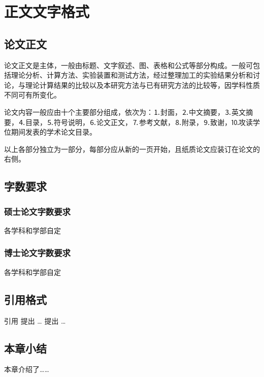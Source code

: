\section{正文文字格式}
\subsection{论文正文}
论文正文是主体，一般由标题、文字叙述、图、表格和公式等部分构成。一般可包括理论分析、计算方法、实验装置和测试方法，经过整理加工的实验结果分析和讨论，与理论计算结果的比较以及本研究方法与已有研究方法的比较等，因学科性质不同可有所变化。\par
论文内容一般应由十个主要部分组成，依次为：⒈封面，⒉中文摘要，⒊英文摘要，⒋目录，⒌符号说明，⒍论文正文，⒎参考文献，⒏附录，⒐致谢，⒑攻读学位期间发表的学术论文目录。\par
以上各部分独立为一部分，每部分应从新的一页开始，且纸质论文应装订在论文的右侧。\par
\subsection{字数要求}
\subsubsection{硕士论文字数要求}
各学科和学部自定
\subsubsection{博士论文字数要求}
各学科和学部自定
\subsection{引用格式}
引用\cite{label1}
\citet{label2}提出 \dots
\citet{label3}提出 \dots

\subsection{本章小结}
本章介绍了……

\newpage